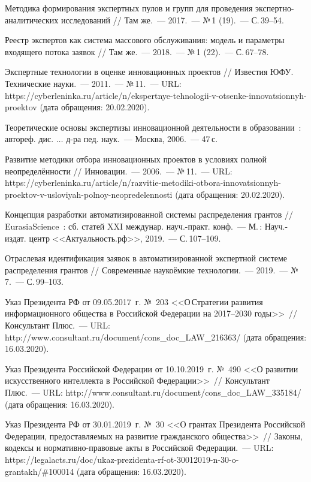 \begin{thebibliography}{99}
\bibitem{} Методика формирования экспертных пулов и групп для проведения экспертно-аналитических исследований // Там же.~--- 2017.~--- №\,1 (19).~--- С.\,39--54.

\bibitem{} Реестр экспертов как система массового обслуживания: модель и параметры входящего потока заявок // Там же.~--- 2018.~--- №\,1 (22).~--- С.\,67--78.

\bibitem{} Экспертные технологии в оценке инновационных проектов // Известия ЮФУ. Технические науки.~--- 2011.~--- №\,11.~--- URL: https://cyberleninka.ru/article/n/ekspertnye-tehnologii-v-otsenke-innovatsionnyh-proektov (дата обращения: 20.02.2020).

\bibitem{} Теоретические основы экспертизы инновационной деятельности в образовании~: автореф. дис. $\dots$ д-ра пед. наук.~--- Москва, 2006.~--- 47\,с.


\bibitem{} Развитие методики отбора инновационных проектов в условиях полной неопределённости // Инновации.~--- 2006.~--- №\,11.~--- URL: https://cyberleninka.ru/article/n/razvitie-metodiki-otbora-innovatsionnyh-proektov-v-usloviyah-polnoy-neopredelennosti (дата обращения: 20.02.2020).

\bibitem{} Концепция разработки автоматизированной системы распределения грантов // EurasiaScience~: сб. статей XXI междунар. науч.-практ. конф.~--- М.\,: Науч.-издат. центр <<Актуальность.рф>>, 2019.~--- С.\,107--109.

\bibitem{} Отраслевая идентификация заявок в автоматизированной экспертной системе распределения грантов // Современные наукоёмкие технологии.~--- 2019.~--- №\,7.~--- С.\,99--103.

\bibitem{}Указ Президента РФ от 09.05.2017~г. №~203 <<О\,Стратегии развития информационного общества в Российской Федерации на 2017--2030 годы>>~// Консультант Плюс.~--- URL: http://www.consultant.ru/document/cons\_doc\_LAW\_216363/ (дата обращения: 16.03.2020).

\bibitem{}Указ Президента Российской Федерации от 10.10.2019~г. №~490 <<О развитии искусственного интеллекта в Российской Федерации>>~// Консультант Плюс.~--- URL: http://www.consultant.ru/document/cons\_doc\_LAW\_335184/ (дата обращения: 16.03.2020).

\bibitem{}Указ Президента РФ от 30.01.2019~г. №~30 <<О грантах Президента Российской Федерации, предоставляемых на развитие гражданского общества>>~// Законы, кодексы и нормативно-правовые акты в Российской Федерации.~--- URL: https://legalacts.ru/doc/ukaz-prezidenta-rf-ot-30012019-n-30-o-grantakh/\#100014 (дата обращения: 16.03.2020).



\end{thebibliography}
